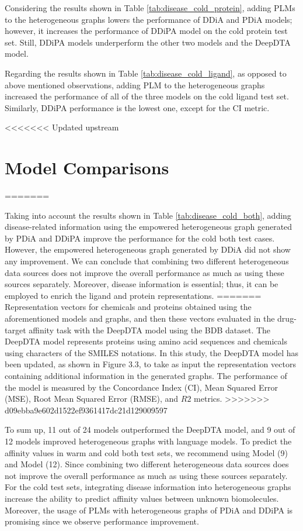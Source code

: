 Considering the results shown in Table \ref{tab:disease_cold_protein}, adding PLMs to the heterogeneous graphs lowers the performance of DDiA and PDiA models; however, it increases the performance of DDiPA model on the cold protein test set. Still, DDiPA models underperform the other two models and the DeepDTA model.



\newpage
Regarding the results shown in Table \ref{tab:disease_cold_ligand}, as opposed to above mentioned observations, adding PLM to the heterogeneous graphs increased the performance of all of the three models on the cold ligand test set. Similarly, DDiPA performance is the lowest one, except for the CI metric. 

<<<<<<< Updated upstream
\section{Model Comparisons}

=======

Taking into account the results shown in Table \ref{tab:disease_cold_both}, adding disease-related information using the empowered heterogeneous graph generated by PDiA and DDiPA improve the performance for the cold both test cases. However, the empowered heterogeneous graph generated by DDiA did not show any improvement. We can conclude that combining two different heterogeneous data sources does not improve the overall performance as much as using these sources separately. Moreover, disease information is essential; thus, it can be employed to enrich the ligand and protein representations.
=======
Representation vectors for chemicals and proteins obtained using the aforementioned models and graphs, and then these vectors evaluated in the drug-target affinity task with the DeepDTA model using the BDB dataset. The DeepDTA model represents proteins using amino acid sequences and chemicals using characters of the SMILES notations. In this study, the DeepDTA model has been updated, as shown in Figure 3.3, to take as input the representation vectors containing additional information in the generated graphs. The performance of the model is measured by the Concordance Index (CI),  Mean Squared Error (MSE), Root Mean Squared Error (RMSE), and $R2$ metrics. 
>>>>>>> d09ebba9e602d1522ef9361417dc21d129009597



To sum up, 11 out of 24 models outperformed the DeepDTA model, and 9 out of 12 models improved heterogeneous graphs with language models. To predict the affinity values in warm and cold both test sets, we recommend using Model (9) and Model (12). Since combining two different heterogeneous data sources does not improve the overall performance as much as using these sources separately. For the cold test sets, integrating disease information into heterogeneous graphs increase the ability to predict affinity values between unknown biomolecules. Moreover, the usage of PLMs with heterogeneous graphs of PDiA and DDiPA is promising since we observe performance improvement. 

